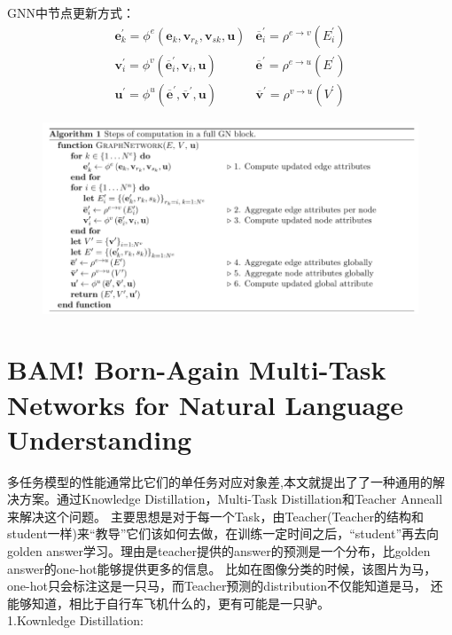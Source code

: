 \documentclass[a4paper,UTF8]{article}
\numberwithin{equation}{section}
\begin{document}
GNN中节点更新方式：
\begin{equation}
\begin{array}{ll}{\mathbf{e}_{k}^{\prime}=\phi^{e}\left(\mathbf{e}_{k}, \mathbf{v}_{r_{k}}, \mathbf{v}_{s k}, \mathbf{u}\right)} & {\overline{\mathbf{e}}_{i}^{\prime}=\rho^{e \rightarrow v}\left(E_{i}^{\prime}\right)} \\ {\mathbf{v}_{i}^{\prime}=\phi^{v}\left(\overline{\mathbf{e}}_{i}^{\prime}, \mathbf{v}_{i}, \mathbf{u}\right)} & {\overline{\mathbf{e}}^{\prime}=\rho^{e \rightarrow u}\left(E^{\prime}\right)} \\ {\mathbf{u}^{\prime}=\phi^{u}\left(\overline{\mathbf{e}}^{\prime}, \overline{\mathbf{v}}^{\prime}, \mathbf{u}\right)} & {\overline{\mathbf{v}}^{\prime}=\rho^{v \rightarrow u}\left(V^{\prime}\right)}\end{array}
\end{equation}
\begin{figure}[H]
	\centering
	\includegraphics[width=\textwidth]{3-2.png}
\end{figure}

\newpage
\section{BAM! Born-Again Multi-Task Networks for Natural Language Understanding}
多任务模型的性能通常比它们的单任务对应对象差,本文就提出了了一种通用的解决方案。通过Knowledge Distillation，Multi-Task Distillation和Teacher Anneall来解决这个问题。
主要思想是对于每一个Task，由Teacher(Teacher的结构和student一样)来“教导”它们该如何去做，在训练一定时间之后，“student”再去向golden answer学习。理由是teacher提供的answer的预测是一个分布，比golden answer的one-hot能够提供更多的信息。
比如在图像分类的时候，该图片为马，one-hot只会标注这是一只马，而Teacher预测的distribution不仅能知道是马，
还能够知道，相比于自行车飞机什么的，更有可能是一只驴。\\
1.Kownledge Distillation:\\
\end{document}
